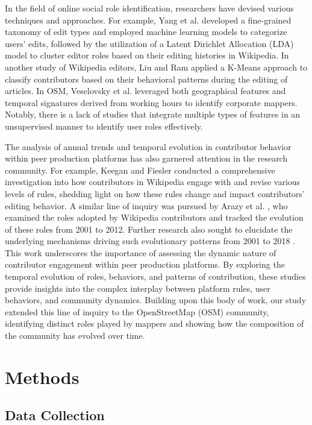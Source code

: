 \documentclass[manuscript,screen,review]{acmart}
\begin{document}
In the field of online social role identification, researchers have devised various techniques and approaches. For example, Yang et al. \cite{Yang21} developed a fine-grained taxonomy of edit types and employed machine learning models to categorize users' edits, followed by the utilization of a Latent Dirichlet Allocation (LDA) model to cluster editor roles based on their editing histories in Wikipedia. In another study of Wikipedia editors, Liu and Ram \cite{liu11} applied a K-Means approach to classify contributors based on their behavioral patterns during the editing of articles. In OSM, Veselovsky et al. \cite{Veselovsky22} leveraged both geographical features and temporal signatures derived from working hours to identify corporate mappers. Notably, there is a lack of studies that integrate multiple types of features in an unsupervised manner to identify user roles effectively.

The analysis of annual trends and temporal evolution in contributor behavior within peer production platforms has also garnered attention in the research community. For example, Keegan and Fiesler \cite{Keegan17} conducted a comprehensive investigation into how contributors in Wikipedia engage with and revise various levels of rules, shedding light on how these rules change and impact contributors' editing behavior. A similar line of inquiry was pursued by Arazy et al. \cite{Arazy15}, who examined the roles adopted by Wikipedia contributors and tracked the evolution of these roles from 2001 to 2012. Further research also sought to elucidate the underlying mechanisms driving such evolutionary patterns from 2001 to 2018 \cite{Arazy20}. This work underscores the importance of assessing the dynamic nature of contributor engagement within peer production platforms. By exploring the temporal evolution of roles, behaviors, and patterns of contribution, these studies provide insights into the complex interplay between platform rules, user behaviors, and community dynamics. Building upon this body of work, our study extended this line of inquiry to the OpenStreetMap (OSM) community, identifying distinct roles played by mappers and showing how the composition of the community has evolved over time. 

\section{Methods}

\subsection{Data Collection}
\end{document}
